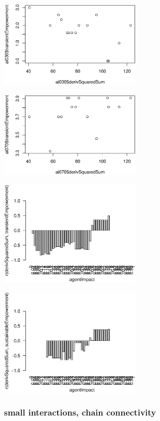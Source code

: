 \documentclass[conference]{IEEEtran}
\begin{document}
\centerline{\includegraphics[width=7cm]{n08_full_large_corr_dss_emp_ai030.eps}}

\centerline{\includegraphics[width=7cm]{n08_full_large_corr_dss_emp_ai070.eps}}

\centerline{\includegraphics[width=7cm]{n08_full_large_corr_dss_emp.eps}}

\centerline{\includegraphics[width=7cm]{n08_full_large_corr_dss_empsust.eps}}


\pagebreak


\subsubsection{small interactions, chain connectivity}
\end{document}
